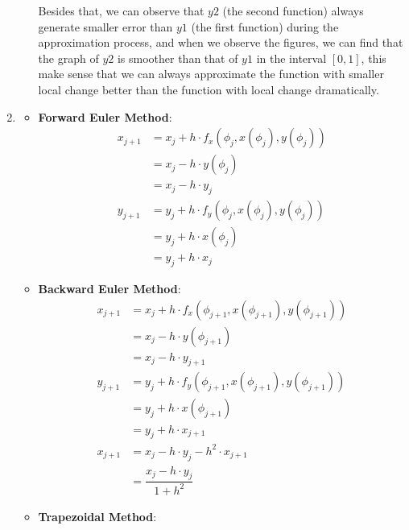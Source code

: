 \documentclass{article}
\begin{document}
\begin{enumerate}
\begin{enumerate}
 
 
 Besides that, we can observe that $y2$ (the second function) always generate smaller error than $y1$ (the first function) during the approximation process, and when we observe the figures, we can find that the graph of $y2$ is smoother than that of $y1$ in the interval $[0,1]$, this make sense that we can always approximate the function with smaller local change better than the function with local change dramatically.
\end{enumerate}
\item
\begin{itemize}
\item \textbf{Forward Euler Method}:\\
\begin{align*}
x_{j+1}&= x_j+ h \cdot f_x(\phi_j, x(\phi_j),y(\phi_j))\\
&=x_j - h \cdot y(\phi_j)\\
&= x_j - h \cdot y_j\\
y_{j+1}&= y_j+ h \cdot f_y(\phi_j, x(\phi_j),y(\phi_j))\\
&=y_j + h \cdot x(\phi_j)\\
&= y_j + h \cdot x_j
\end{align*}
\item \textbf{Backward Euler Method}:\\
\begin{align*}
x_{j+1}&= x_j+ h \cdot f_x(\phi_{j+1}, x(\phi_{j+1}),y(\phi_{j+1}))\\
&=x_j - h \cdot y(\phi_{j+1})\\
&= x_j - h \cdot y_{j+1}\\
y_{j+1}&= y_j+ h \cdot f_y(\phi_{j+1}, x(\phi_{j+1}),y(\phi_{j+1}))\\
&=y_j+ h \cdot x(\phi_{j+1})\\
&= y_j+ h \cdot x_{j+1}\\
x_{j+1}&= x_j - h \cdot y_j- h^2 \cdot x_{j+1}\\
&=\dfrac{x_j - h \cdot y_j}{1+h^2}
\end{align*}
\item \textbf{Trapezoidal Method}:\\


\end{itemize}
\end{enumerate}
\end{document}
